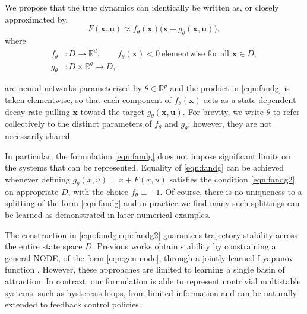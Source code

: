 \documentclass[11pt,twoside]{article}
\theoremstyle{plain}
\theoremstyle{definition}
\theoremstyle{remark}
\newcommand{\vect}[1]{\boldsymbol{#1}}
\newcommand{\R}{\mathbb{R}}
\begin{document}
We propose that the true dynamics can identically be written as, or closely approximated by,
\begin{equation}
    F(\vect{x}, \vect{u}) \approx f_\theta(\vect{x}) \bigl(\vect{x} - g_\theta(\vect{x}, \vect{u})\bigr),
    \label{eqn:fandg}
\end{equation}
where 
\begin{equation}
    \begin{split}
        f_\theta &: D \to \mathbb{R}^d, 
        \qquad f_\theta(\vect{x}) < 0 \ \text{elementwise for all } \vect{x} \in D,\\[0.2em]
        g_\theta &: D \times \mathbb{R}^q \to D,
    \end{split}
    \label{eqn:fandg2}
\end{equation}

are neural networks parameterized by \(\theta \in \R^p\) and the product in \cref{eqn:fandg} is taken elementwise, so that each component of \(f_\theta(\vect{x})\) acts as a state-dependent decay rate pulling \(\vect{x}\) toward the target \(g_\theta(\vect{x},\vect{u})\). For brevity, we write \(\theta\) to refer collectively to the distinct parameters of \(f_\theta\) and \(g_\theta\); however, they are not necessarily shared.

In particular, the formulation \cref{eqn:fandg} does not impose significant limits on the systems that can be represented. Equality of \cref{eqn:fandg} can be achieved whenever defining \( g_{\theta}(x,u) = x + F(x,u)\) satisfies the condition \cref{eqn:fandg2} on appropriate \(D\), with the choice \(f_{\theta} \equiv -1\). Of course, there is no uniqueness to a splitting of the form \cref{eqn:fandg} and in practice we find many such  splittings can be learned as demonstrated in later numerical examples.

The construction in \cref{eqn:fandg,eqn:fandg2} guarantees trajectory stability across the entire state space \(D\). Previous works obtain stability by constraining a general NODE, of the form \cref{eqn:gen-node}, through a jointly learned Lyapunov function \cite{Kolter2019LearningSD}. However, these approaches are limited to learning a single basin of attraction. In contrast, our formulation is able to represent nontrivial multistable systems, such as hysteresis loops, from limited information and can be naturally extended to feedback control policies.
\end{document}
